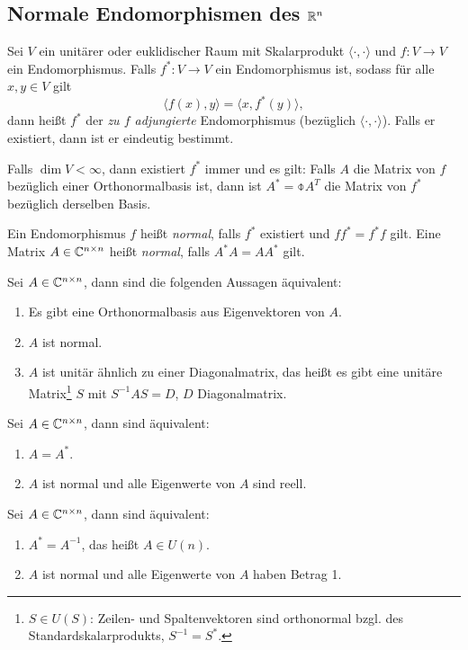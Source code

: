 \subsection*{Normale Endomorphismen des $\mathbb{R}^n$}
\begin{mydef}
Sei $V$ ein unitärer oder euklidischer Raum mit Skalarprodukt $\langle \cdot, \cdot \rangle$ und $f:V \to V$ ein Endomorphismus. Falls $f^*:V \to V$ ein Endomorphismus ist, sodass für alle $x,y \in V$ gilt
\[ \langle f(x), y \rangle = \langle x, f^*(y) \rangle, \]
dann heißt $f^*$ der \emph{zu $f$ adjungierte} Endomorphismus (bezüglich $\langle \cdot, \cdot \rangle$). Falls er existiert, dann ist er eindeutig bestimmt.

Falls $\dim V < \infty$, dann existiert $f^*$ immer und es gilt: Falls $A$ die Matrix von $f$ bezüglich einer Orthonormalbasis ist, dann ist $A^* = \obar{A}^T$ die Matrix von $f^*$ bezüglich derselben Basis.

Ein Endomorphismus $f$ heißt \emph{normal}, falls $f^*$ existiert und $f f^* = f^* f$ gilt. Eine Matrix $A \in \mathbb{C}^{n \times n}$ heißt \emph{normal}, falls $A^* A = A A^*$ gilt.
\end{mydef}

\begin{thm}
 Sei $A \in \mathbb{C}^{n \times n}$, dann sind die folgenden Aussagen äquivalent:
 \begin{enumerate}[(1)]
  \item Es gibt eine Orthonormalbasis aus Eigenvektoren von $A$.
  \item $A$ ist normal.
  \item $A$ ist unitär ähnlich zu einer Diagonalmatrix, das heißt es gibt eine unitäre Matrix\footnote{$S \in U(S)$: Zeilen- und Spaltenvektoren sind orthonormal bzgl. des Standardskalarprodukts, $S^{-1} = S^*$.} $S$ mit $S^{-1} A S = D$, $D$ Diagonalmatrix.
 \end{enumerate}
\end{thm}

\begin{folg}
 Sei $A \in \mathbb{C}^{n \times n}$, dann sind äquivalent:
 \begin{enumerate}[(1)]
  \item $A = A^*$.
  \item $A$ ist normal und alle Eigenwerte von $A$ sind reell.
 \end{enumerate}
\end{folg}

\begin{folg}
 Sei $A \in \mathbb{C}^{n \times n}$, dann sind äquivalent:
 \begin{enumerate}[(1)]
  \item $A^* = A^{-1}$, das heißt $A \in U(n)$.
  \item $A$ ist normal und alle Eigenwerte von $A$ haben Betrag 1.
 \end{enumerate}
\end{folg}

